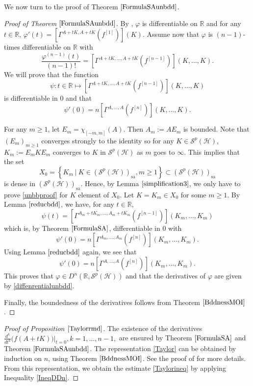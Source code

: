 \documentclass[12pt]{amsart}
\theoremstyle{remark}
\renewcommand{\H}{\mbox{${\mathcal H}$}}
\def\Sc{{\mathcal{S}}}
\begin{document}
We now turn to the proof of Theorem $\ref{FormulaSAunbdd}$.

\begin{proof}[Proof of Theorem $\ref{FormulaSAunbdd}$]
By \cite[Theorem 7.18]{KPSS}, $\varphi$ is differentiable on $\mathbb{R}$ and for any $t\in \mathbb{R}$, $\varphi'(t) = \left[\Gamma^{A+tK, A+tK}(f^{[1]}) \right](K).$ 
Assume now that $\varphi$ is $(n-1)$-times differentiable on $\mathbb{R}$ with
$$
\dfrac{\varphi^{(n-1)}(t)}{(n-1)!} = \left[\Gamma^{A+tK, \ldots, A+tK}(f^{[n-1]}) \right](K, \ldots, K).
$$
We will prove that the function
$$
\psi : t\in \mathbb{R} \mapsto \left[\Gamma^{A+tK, \ldots, A+tK}(f^{[n-1]}) \right](K, \ldots, K)
$$
is differentiable in $0$ and that
\begin{equation}\label{unbbproof}
\psi'(0) = n \left[\Gamma^{A, \ldots, A}(f^{[n]}) \right](K, \ldots, K).
\end{equation}


For any $m\geq 1$, let $E_m = \chi_{[-m,m]}(A)$. Then $A_m := AE_m$ is bounded. Note that $(E_m)_{m\geq 1}$ converges strongly to the identity so for any $K\in \mathcal{S}^p(\mathcal{H})$, $K_m:=E_m K E_m$ converges to $K$ in $\mathcal{S}^p(\mathcal{H})$ as $m$ goes to $\infty$. This implies that the set
$$
X_0 = \left\lbrace K_m \ | \ K \in (\mathcal{S}^p(\mathcal{H}))_{\text{sa}}, m\geq 1 \right\rbrace \subset (\mathcal{S}^p(\mathcal{H}))_{\text{sa}}
$$
is dense in $(\mathcal{S}^p(\mathcal{H}))_{\text{sa}}$. Hence, by Lemma $\ref{simplification3}$, we only have to prove \eqref{unbbproof} for $K$ element of $X_0$. Let $K=K_m \in X_0$ for some $m\geq 1$.
By Lemma $\ref{reducbdd}$, we have, for any $t\in \mathbb{R}$,
$$
\psi(t) = \left[\Gamma^{A_m+tK_m, \ldots, A_m+tK_m}(f^{[n-1]}) \right](K_m, \ldots, K_m)
$$
which is, by Theorem $\ref{FormulaSA}$, differentiable in $0$ with
$$
\psi'(0) = n\left[\Gamma^{A_m, \ldots, A_m}(f^{[n]}) \right](K_m, \ldots, K_m).
$$
Using Lemma $\ref{reducbdd}$ again, we see that
$$
\psi'(0) = n\left[\Gamma^{A, \ldots, A}(f^{[n]}) \right](K_m, \ldots, K_m).
$$
This proves that $\varphi \in D^n(\mathbb{R},\Sc^p(\H))$ and that the derivatives of $\varphi$ are given by \eqref{diffenrentialunbdd}.

Finally, the boundedness of the derivatives follows from Theorem $\ref{BddnessMOI}$.

\end{proof}



\begin{proof}[Proof of Proposition $\ref{Taylorrmd}$]
The existence of the derivatives $\displaystyle \frac{d^k}{dt^k}\Big(f(A+tK)\Big)\Big|_{t=0}, k=1, \ldots, n-1,$ are ensured by Theorem $\ref{FormulaSA}$ and Theorem $\ref{FormulaSAunbdd}$. The representation \eqref{Taylor} can be obtained by induction on $n$, using Theorem $\ref{BddnessMOI}$. See the proof of \cite[Theorem 4.1 (ii)]{CLSS} for more details. From this representation, we obtain the estimate \eqref{Taylorineq} by applying Inequality \eqref{IneqDDn}.

\end{proof}
\end{document}
